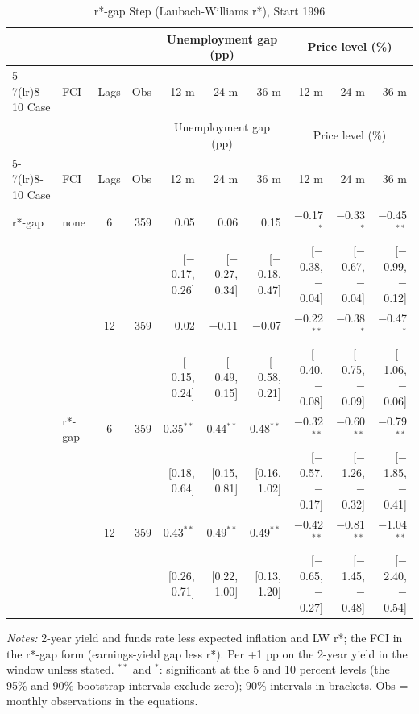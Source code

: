 \begingroup\scriptsize\setlength{\tabcolsep}{0.9pt}
\begin{longtable}{llcrrrrrrr}
\caption{r*-gap Step (Laubach-Williams r*), Start 1996}\label{tab:appF1}\\
\toprule
 & & & & \multicolumn{3}{c}{Unemployment gap (pp)} & \multicolumn{3}{c}{Price level (\%)}\\ \cmidrule(lr){5-7}\cmidrule(lr){8-10}
Case & FCI & Lags & Obs & 12 m & 24 m & 36 m & 12 m & 24 m & 36 m\\
\midrule\endfirsthead
\toprule
 & & & & \multicolumn{3}{c}{Unemployment gap (pp)} & \multicolumn{3}{c}{Price level (\%)}\\ \cmidrule(lr){5-7}\cmidrule(lr){8-10}
Case & FCI & Lags & Obs & 12 m & 24 m & 36 m & 12 m & 24 m & 36 m\\
\midrule\endhead
\bottomrule\endfoot
r*-gap & none & 6 & 359 & 0.05 & 0.06 & 0.15 & $-$0.17$^{*}$ & $-$0.33$^{*}$ & $-$0.45$^{**}$\\
 & & & & {\scriptsize [$-$0.17, 0.26]} & {\scriptsize [$-$0.27, 0.34]} & {\scriptsize [$-$0.18, 0.47]} & {\scriptsize [$-$0.38, $-$0.04]} & {\scriptsize [$-$0.67, $-$0.04]} & {\scriptsize [$-$0.99, $-$0.12]}\\
 &  & 12 & 359 & 0.02 & $-$0.11 & $-$0.07 & $-$0.22$^{**}$ & $-$0.38$^{*}$ & $-$0.47$^{*}$\\
 & & & & {\scriptsize [$-$0.15, 0.24]} & {\scriptsize [$-$0.49, 0.15]} & {\scriptsize [$-$0.58, 0.21]} & {\scriptsize [$-$0.40, $-$0.08]} & {\scriptsize [$-$0.75, $-$0.09]} & {\scriptsize [$-$1.06, $-$0.06]}\\
 & r*-gap & 6 & 359 & 0.35$^{**}$ & 0.44$^{**}$ & 0.48$^{**}$ & $-$0.32$^{**}$ & $-$0.60$^{**}$ & $-$0.79$^{**}$\\
 & & & & {\scriptsize [0.18, 0.64]} & {\scriptsize [0.15, 0.81]} & {\scriptsize [0.16, 1.02]} & {\scriptsize [$-$0.57, $-$0.17]} & {\scriptsize [$-$1.26, $-$0.32]} & {\scriptsize [$-$1.85, $-$0.41]}\\
 &  & 12 & 359 & 0.43$^{**}$ & 0.49$^{**}$ & 0.49$^{**}$ & $-$0.42$^{**}$ & $-$0.81$^{**}$ & $-$1.04$^{**}$\\
 & & & & {\scriptsize [0.26, 0.71]} & {\scriptsize [0.22, 1.00]} & {\scriptsize [0.13, 1.20]} & {\scriptsize [$-$0.65, $-$0.27]} & {\scriptsize [$-$1.45, $-$0.48]} & {\scriptsize [$-$2.40, $-$0.54]}\\
\end{longtable}
\begin{flushleft}\footnotesize\textit{Notes:} 2-year yield and funds rate less expected inflation and LW r*; the FCI in the r*-gap form (earnings-yield gap less r*). Per +1 pp on the 2-year yield in the window unless stated. $^{**}$ and $^{*}$: significant at the 5 and 10 percent levels (the 95\% and 90\% bootstrap intervals exclude zero); 90\% intervals in brackets. Obs = monthly observations in the equations.\end{flushleft}
\endgroup
